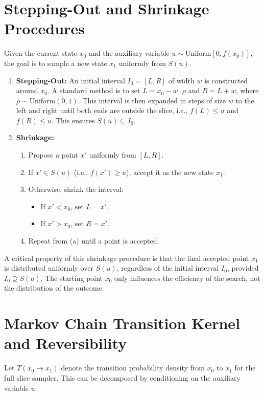 \documentclass[12pt]{article}
\theoremstyle{definition}
\begin{document}
\section{Stepping-Out and Shrinkage Procedures}
Given the current state \( x_0 \) and the auxiliary variable \( u \sim \text{Uniform}[0, f(x_0)] \), the goal is to sample a new state \( x_1 \) uniformly from \( S(u) \).

\begin{enumerate}[label=\textbf{Step \arabic*.}]
    \item \textbf{Stepping-Out:} An initial interval \( I_0 = [L, R] \) of width \( w \) is constructed around \( x_0 \). A standard method is to set \( L = x_0 - w \cdot \rho \) and \( R = L + w \), where \( \rho \sim \text{Uniform}(0,1) \). This interval is then expanded in steps of size \( w \) to the left and right until both ends are outside the slice, i.e., \( f(L) \le u \) and \( f(R) \le u \). This ensures \( S(u) \subseteq I_0 \).
    \item \textbf{Shrinkage:}
    \begin{enumerate}
        \item Propose a point \( x' \) uniformly from \( [L, R] \).
        \item If \( x' \in S(u) \) (i.e., \( f(x') \ge u \)), accept it as the new state \( x_1 \).
        \item Otherwise, shrink the interval:
        \begin{itemize}
            \item If \( x' < x_0 \), set \( L = x' \).
            \item If \( x' > x_0 \), set \( R = x' \).
        \end{itemize}
        \item Repeat from (a) until a point is accepted.
    \end{enumerate}
\end{enumerate}
A critical property of this shrinkage procedure is that the final accepted point \( x_1 \) is distributed uniformly over \( S(u) \), regardless of the initial interval \( I_0 \), provided \( I_0 \supseteq S(u) \). The starting point \( x_0 \) only influences the efficiency of the search, not the distribution of the outcome.

\section{Markov Chain Transition Kernel and Reversibility}
Let \( T(x_0 \to x_1) \) denote the transition probability density from \( x_0 \) to \( x_1 \) for the full slice sampler. This can be decomposed by conditioning on the auxiliary variable \( u \).
\end{document}
